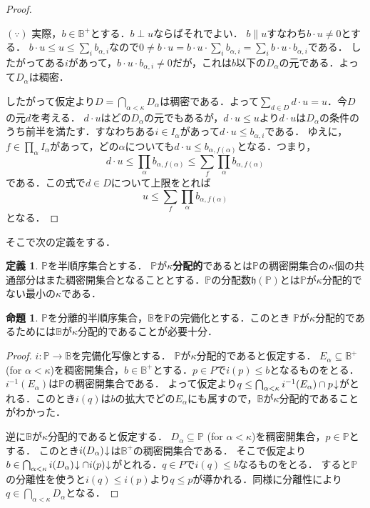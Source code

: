 \documentclass[uplatex,dvipdfmx]{jsarticle}
\renewcommand{\P}{\mathbb{P}}
\newcommand{\B}{\mathbb{B}}
\newcommand{\h}{\mathfrak{h}}
\newcommand{\down}{\hspace{-0.2em}\downarrow}
\renewcommand\subset{\subseteq}
\theoremstyle{definition}
\newtheorem*{defi*}{定義}
\newtheorem{prop}[thm]{命題}
\theoremstyle{named}
\newenvironment{reason}
{
    \begin{mdframed}[backgroundcolor=reasonbg,linewidth=0]
    \color{reasontext}
    \small
}
{
    \end{mdframed}
}
\begin{document}
\begin{proof}
\begin{reason}
$(\because)$ 実際，$b \in \B^+$とする．$b \perp u$ならばそれでよい．
$b \parallel u$すなわち$b \cdot u \ne 0$とする．
$b \cdot u \le u \le \sum_i b_{\alpha,i}$なので$0 \ne b \cdot u = b \cdot u \cdot  \sum_i b_{\alpha,i} = \sum_i b \cdot u \cdot b_{\alpha,i}$である．
したがってある$i$があって，$b \cdot u \cdot b_{\alpha,i} \ne 0$だが，これは$b$以下の$D_\alpha$の元である．よって$D_\alpha$は稠密．
\end{reason}

したがって仮定より$D = \bigcap_{\alpha < \kappa} D_\alpha$は稠密である．よって$\sum_{d \in D} d \cdot u = u$．今$D$の元$d$を考える．
$d \cdot u$はどの$D_\alpha$の元でもあるが，$d \cdot u \le u$より$d \cdot u$は$D_\alpha$の条件のうち前半を満たす．すなわちある$i \in I_\alpha$があって$d \cdot u \le b_{\alpha,i}$である．
ゆえに，$f \in \prod_\alpha I_\alpha$があって，どの$\alpha$についても$d \cdot u \le b_{\alpha,f(\alpha)}$となる．つまり，
\[
d \cdot u \le \prod_{\alpha} b_{\alpha,f(\alpha)} \le \sum_f \prod_{\alpha} b_{\alpha,f(\alpha)}
\]
である．この式で$d \in D$について上限をとれば
\[
u \le \sum_f \prod_{\alpha} b_{\alpha,f(\alpha)}
\]
となる．
\end{proof}

そこで次の定義をする．

\begin{defi*}
$\P$を半順序集合とする．
$\P$が{\bfseries $\kappa$分配的}であるとは$\P$の稠密開集合の$\kappa$個の共通部分はまた稠密開集合となることとする．$\P$の分配数$\h(\P)$とは$\P$が$\kappa$分配的でない最小の$\kappa$である．
\end{defi*}

\begin{prop}
$\P$を分離的半順序集合，$\B$を$\P$の完備化とする．このとき
$\P$が$\kappa$分配的であるためには$\B$が$\kappa$分配的であることが必要十分．
\end{prop}
\begin{proof}
$i: \P \to \B$を完備化写像とする．
$\P$が$\kappa$分配的であると仮定する．
$E_\alpha \subset \B^+$ (for $\alpha < \kappa$)を稠密開集合，$b \in \B^+$とする．$p \in P$で$i(p) \le b$となるものをとる．
$i^{-1}(E_\alpha)$は$\P$の稠密開集合である．
よって仮定より$q \le \bigcap_{\alpha < \kappa} i^{-1}(E_\alpha) \cap p\down$がとれる．このとき$i(q)$は$b$の拡大でどの$E_\alpha$にも属すので，$\B$が$\kappa$分配的であることがわかった．

逆に$\B$が$\kappa$分配的であると仮定する．
$D_\alpha \subset \P$ (for $\alpha < \kappa$)を稠密開集合，$p \in \P$とする．
このとき$i(D_\alpha)\down$は$\B^+$の稠密開集合である．
そこで仮定より$b \in \bigcap_{\alpha < \kappa} i(D_\alpha)\down \cap i(p)\down$がとれる．$q \in P$で$i(q) \le b$なるものをとる．
すると$\P$の分離性を使うと$i(q) \le i(p)$より$q \le p$が導かれる．同様に分離性により$q \in \bigcap_{\alpha < \kappa} D_\alpha$となる．
\end{proof}
\end{document}
